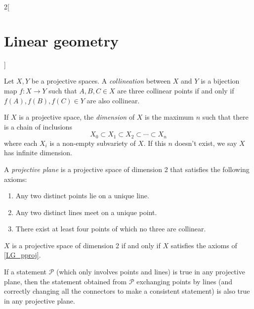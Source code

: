 \documentclass[../../../main_math.tex]{subfiles}
\begin{document}
\begin{multicols}{2}[\section{Linear geometry}]
\begin{proposition}
  \end{proposition}
  \begin{definition}
    Let $X,Y$ be a projective spaces. A \emph{collineation} between $X$ and $Y$ is a bijection map $f:X\rightarrow Y$ such that $A,B,C\in X$ are three collinear points if and only if $f(A),f(B),f(C)\in Y$ are also collinear.
  \end{definition}
  \begin{definition}
    If $X$ is a projective space, the \emph{dimension} of $X$ is the maximum $n$ such that there is a chain of inclusions $$X_0\subset X_1\subset X_2 \subset\cdots\subset X_n$$ where each $X_i$ is a non-empty subvariety of $X$. If this $n$ doesn't exist, we say $X$ has infinite dimension.
  \end{definition}
  \begin{definition}\label{LG_pproj}
    A \emph{projective plane} is a projective space of dimension 2 that satisfies the following axioms:
    \begin{enumerate}
      \item Any two distinct points lie on a unique line.
      \item Any two distinct lines meet on a unique point.
      \item There exist at least four points of which no three are collinear.
    \end{enumerate}
  \end{definition}
  \begin{theorem}
    $X$ is a projective space of dimension 2 if and only if $X$ satisfies the axioms of \cref{LG_pproj}.
  \end{theorem}
  \begin{theorem}
    If a statement $\mathcal{P}$ (which only involves points and lines) is true in any projective plane, then the statement obtained from $\mathcal{P}$ exchanging points by lines (and correctly changing all the connectors to make a consistent statement) is also true in any projective plane.
  \end{theorem}

\end{multicols}
\end{document}
